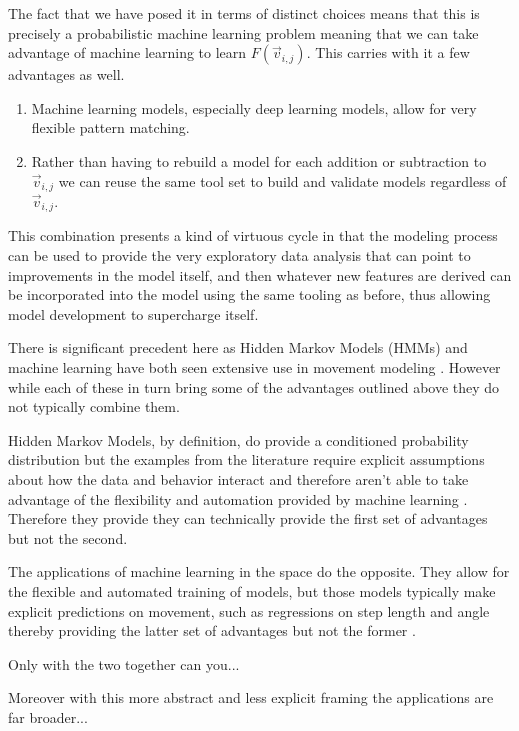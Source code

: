 \documentclass[11pt]{article}
\begin{document}
The fact that we have posed it in terms of distinct choices means that this is precisely a probabilistic machine learning problem \citep{durr} meaning that we can take advantage of machine learning to learn $F(\vec{v}_{i,j})$. This carries with it a few advantages as well. 

\begin{enumerate}
\item Machine learning models, especially deep learning models, allow for very flexible pattern matching.
\item Rather than having to rebuild a model for each addition or subtraction to $\vec{v}_{i,j}$ we can reuse the same tool set to build and validate models regardless of $\vec{v}_{i,j}$. 
\end{enumerate}

This combination presents a kind of virtuous cycle in that the modeling process can be used to provide the very exploratory data analysis that can point to improvements in the model itself, and then whatever new features are derived can be incorporated into the model using the same tooling as before, thus allowing model development to supercharge itself. 

There is significant precedent here as Hidden Markov Models (HMMs) and machine learning have both seen extensive use in movement modeling \citep{mlmovement1}. However while each of these in turn bring some of the advantages outlined above they do not typically combine them. 

Hidden Markov Models, by definition, do provide a conditioned probability distribution but the examples from the literature require explicit assumptions about how the data and behavior interact and therefore aren't able to take advantage of the flexibility and automation provided by machine learning \citep{mlmovement1}. Therefore they provide they can technically provide the first set of advantages but not the second. 

The applications of machine learning in the space do the opposite. They allow for the flexible and automated training of models, but those models typically make explicit predictions on movement, such as regressions on step length and angle thereby providing the latter set of advantages but not the former \citep{mlmovement1}\citep{mlmovement2}\citep{mlmovement3}.  

Only with the two together can you...

Moreover with this more abstract and less explicit framing the applications are far broader...
\end{document}
